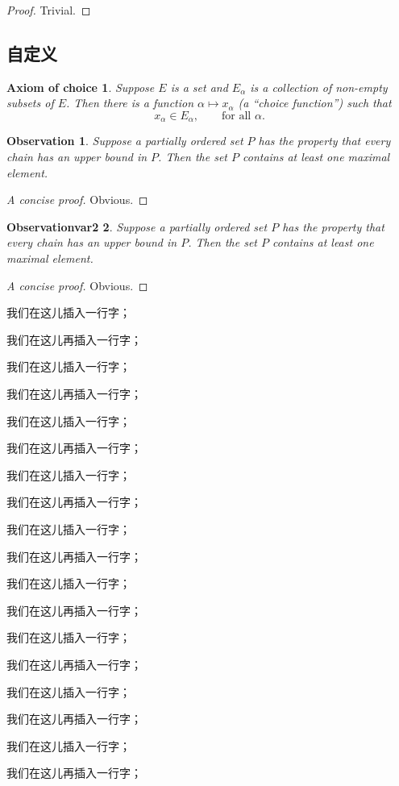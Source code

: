 \begin{proof}
  Trivial.
\end{proof}



\subsection{自定义}

\newtheorem*{axiomofchoice}{Axiom of choice}
\begin{axiomofchoice}
  Suppose $E$ is a set and ${E_\alpha}$ is a collection of
  non-empty subsets of $E$. Then there is a function $\alpha
  \mapsto x_\alpha$ (a ``choice function'') such that
  \begin{equation}
  x_\alpha \in E_\alpha,\qquad \text{for all }\alpha.
  \end{equation}
\end{axiomofchoice}

\newtheorem{observation}{Observation}[chapter]
\begin{observation}
  Suppose a partially ordered set $P$ has the property
  that every chain has an upper bound in $P$. Then the
  set $P$ contains at least one maximal element.
\end{observation}
\begin{proof}[A concise proof]
  Obvious.
\end{proof}

\newtheorem{observationvar2}[observation]{Observationvar2}
\begin{observationvar2}
  Suppose a partially ordered set $P$ has the property
  that every chain has an upper bound in $P$. Then the
  set $P$ contains at least one maximal element.
\end{observationvar2}
\begin{proof}[A concise proof]
  Obvious.
\end{proof}

我们在这儿插入一行字；

我们在这儿再插入一行字；

我们在这儿插入一行字；

我们在这儿再插入一行字；

我们在这儿插入一行字；

我们在这儿再插入一行字；

我们在这儿插入一行字；

我们在这儿再插入一行字；

我们在这儿插入一行字；

我们在这儿再插入一行字；

我们在这儿插入一行字；

我们在这儿再插入一行字；

我们在这儿插入一行字；

我们在这儿再插入一行字；

我们在这儿插入一行字；

我们在这儿再插入一行字；

我们在这儿插入一行字；

我们在这儿再插入一行字；